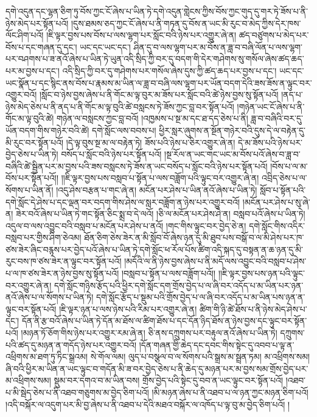 དགེ་འདུན་དང་ལྷན་ཅིག་ཏུ་བོས་ཀྱང་ངོ་ཞེས་པ་ཡིན་ཏེ་དགེ་འདུན་གླེངས་ཀྱིས་བོས་ཀྱང་གུད་དུ་གར་ཏེ་ཟོས་པ་ནི་ཉེས་མེད་པར་སྟོན་པའོ། །དུས་ཐམས་ཅད་ཀྱང་ངོ་ཞེས་པ་ནི་གཏན་དུ་བོས་ན་ཡང་མི་རུང་བ་མེད་ཀྱིས་དེར་ཁས་ལོང་ཤིག་པའོ། །ཇི་ལྟར་བྱས་པས་བོས་པ་ལས་ལྷག་པར་སློང་བའི་ཉེས་པར་འགྱུར་ཞེ་ན། ཚད་བཙུགས་པ་མེད་པར་བོས་པ་དང་གཞན་དུ་དང་། ཡང་དང་ཡང་དང་། ཤིན་དུ་བ་ལས་ལྷག་པར་མ་བོས་ན་ཟླ་བ་བཞི་ལོན་པ་ལས་ལྷག་པར་བཤགས་པ་ཟ་ནའོ་ཞེས་པ་ཡིན་ཏེ་ཡུན་འདི་སྲིད་ཀྱི་བར་དུ་བདག་གི་དེར་གཤེགས་སུ་གསོལ་ཞེས་ཚད་ཆད་པར་མ་བྱས་པ་དང་། འདི་སྲིད་ཀྱི་བར་དུ་གཤེགས་པར་གསོལ་ཞེས་དུས་ཀྱི་ཚད་ཆད་པར་བྱས་པ་དང་། ཡང་དང་ཡང་སྣོན་པ་དང་སྙིང་ནས་བོས་པ་རྣམས་མ་ཡིན་ལ་ཟླ་བ་བཞི་ལས་ལྷག་པར་ཡོན་བདག་དེའི་ཟས་ཟོས་ན་ལྟུང་བར་འགྱུར་བའོ། །སློང་བ་ཉེས་བྱས་ཞེས་པ་ནི་གོང་མ་ལྟ་བུར་མ་ཟོས་པར་སློང་བའི་ཚེ་ཉེས་བྱས་སུ་སྟོན་པའོ། །ནད་པ་ཉེས་མེད་ཅེས་པ་ནི་ནད་པ་ནི་གོང་མ་ལྟ་བུའི་ཚེ་བསླངས་ཏེ་ཟོས་ཀྱང་བླ་བར་སྟོན་པའོ། །གཉེན་ཡང་ངོ་ཞེས་པ་ནི་གོང་མ་ལྟ་བུའི་ཚེ། གཉེན་ལ་བསླངས་ཀྱང་བླ་བའོ། །འཁྱམས་པ་སྔ་མ་དང་ཐ་དད་ཅེས་པ་ནི། ཟླ་བ་བཞིའི་བར་དུ་ཡོན་བདག་གིས་གཉེར་བའི་ཚེ། དགེ་སློང་ལས་བབས་པ། ཕྱིར་སླར་ཞུགས་ན་སྔོན་གཉེར་བའི་དུས་དེ་ལ་བརྟེན་དུ་མི་རུང་བར་སྟོན་པའོ། །དེ་ལྟ་བུས་སྔ་མ་ལ་བརྟེན་ཏེ། ཟོས་པའི་ཉེས་པ་ཅིར་འགྱུར་ཞེ་ན། དེ་མ་ཟོས་པའི་ཉེས་པར་བྱེད་ཅེས་པ་ཡིན་ཏེ། བསོད་པ་སློང་བའི་ཉེས་པར་སྟོན་པའོ། །སྔ་རོལ་ན་ཡང་གང་ཡང་མ་བོས་པའོ་ཞེས་བ་ཟླ་བ་བཞིའི་ཚེ་སྦྱིན་པར་མ་བྱས་པའི་ཟས་བསླངས་ཏེ་ཟོས་ན་ཡང་བསོད་པ་སློང་བའི་ཉེས་པར་སྟོན་པའོ། །བོས་པ་ལ་མ་བོས་པར་སྟོན་པའོ།། །།ཇི་ལྟར་བྱས་པས་བསླབ་པ་སྟོན་པ་ལས་བཟློག་པའི་ལྟུང་བར་འགྱུར་ཞེ་ན། འབྲིད་ཅེས་པ་ལ་སོགས་པ་ཡིན་ནོ། །འདུ་ཤེས་བརྩན་པ་གང་ཞེ་ན། མངོན་པར་ཤེས་པ་ཡིན་ནའོ་ཞེས་པ་ཡིན་ཏེ། སློབ་པ་སྟོན་པའི་དགེ་སློང་དེ་ཤེས་པ་དང་ལྡན་བར་བདག་གིས་ཤེས་ལ་སླར་བཟློག་ན་ཉེས་པར་འགྱུར་བའོ། །མངོན་པར་ཤེས་པ་སུ་ཞེ་ན། ཟེར་བའོ་ཞེས་པ་ཡིན་ཏེ་གང་སྟོན་ཅིང་སྨྲ་བ་དེ་ལའོ། །ཅི་ལ་མངོན་པར་ཤེས་ཤེ་ན། བསླབ་པའོ་ཞེས་པ་ཡིན་ཏེ། འདུལ་བ་ལས་འབྱུང་བའི་བསླབ་པ་མངོན་པར་ཤེས་པ་ནའོ། །གང་གིས་ལྟུང་བར་བྱེད་ཅེ་ན། དགེ་སློང་གིས་འདིར་བསླབ་པར་གྱིས་ཤིག་ཅེའམ། ཐོན་ཅིག་ཅེས་ཟེར་ན་མི་སློབ་བོ་ཞེས་ཉན་དུ་མི་ཐུབ་པས་བསྒོ་བ་ལ་མི་ཤེས་པར་ཁ་ཙས་ཟེར་ཞིང་བརྙས་པར་བྱེད་པའོ་ཞེས་པ་ཡིན་ཏེ་དགེ་སློང་ཕ་རོལ་པོས་ཚིག་འདི་སྐད་དུ་བསྟན་ན་ཆ་ཉན་དུ་མི་རུང་བས་ཁ་ཙས་ཟེར་ན་ལྟུང་བར་སྟོན་པའོ། །མདོའི་ལ་ནི་ཉེས་བྱས་ཞེས་པ་ནི་མདོ་ལས་འབྱུང་བའི་བསླབ་པ་ཤེས་པ་ལ་ཁ་ཙས་ཟེར་ན་ཉེས་བྱས་སུ་སྟོན་པའོ། །བསླབ་པ་སྟོན་པ་ལས་བཟློག་པའོ།། །།ཇི་ལྟར་བྱས་པས་ཉན་པའི་ལྟུང་བར་འགྱུར་ཞེ་ན། དགེ་སློང་གཉིས་རྩོད་པའི་ཕྱིར་དགེ་སློང་དག་གྲོས་བྱེད་པ་ལ་ཞི་བར་འདོད་པ་མ་ཡིན་པར་ཉན་ནའོ་ཞེས་པ་ལ་སོགས་པ་ཡིན་ཏེ། དགེ་སློང་རྩོད་པ་སྡུམ་པའི་གྲོས་བྱེད་པ་ལ་ཞི་བར་འདོད་པ་མ་ཡིན་པས་ཉན་ན་ལྟུང་བར་སྟོན་པའོ། །ཇི་ལྟར་ཉན་པ་ལས་ཉེས་པའི་རིམ་པར་འགྱུར་ཞེ་ན། ཚིག་གི་ཉི་ཚེ་ཐོས་པ་ནི་ཉེས་མེད་ཤེས་པ་དང་། དོན་ནི་རྩ་བའོ་ཞེས་པ་ཡིན་ཏེ་དོན་མ་ཐོས་ལ་ཚིག་ཐོས་པ་དང་དོན་ཉིད་ཐོས་ན་ཉེས་བྱས་དང་ལྟུང་བར་སྟོན་པའོ། །མཉན་ཏོ་ཅོག་གིས་ཉེས་པར་འགྱུར་རམ་ཞེ་ན། ཅི་ནས་དཀྲུགས་པར་བརྟུལ་ནའོ་ཞེས་པ་ཡིན་ཏེ། དཀྲུགས་པའི་ཚད་དུ་མཉན་ན་གདོད་ཉེས་པར་འགྱུར་བའོ། །དོན་གཞན་གྱི་ཆེད་དང་དབང་གིས་སྟེང་དུ་འབབ་པ་ལྟ་ན་འཕྲིགས་མ་ཐག་ཏུ་ཏིང་སྒྲའམ། སེ་གོལ་ལམ། ལུད་པ་བསྩལ་བ་ལ་སོགས་པའི་སྒྲས་མ་སྦྲན་ཏམ། མ་འཕྲིགས་སམ། ཞི་བའི་ཕྱིར་མ་ཡིན་ན་ཡང་ལྟུང་བ་གདོན་མི་ཟ་བར་བྱེད་ཅེས་པ་ནི་ཆེད་དུ་མཉན་པར་མ་བྱས་སམ་གྲོས་བྱེད་པར་མ་འཕྲིགས་སམ། སྡུམ་བར་དགའ་བ་མ་ཡིན་བས། གྲོས་བྱེད་པའི་སྟེང་དུ་བབ་ན་ཡང་ལྟུང་བར་སྟོན་པའོ། །འཐབ་པ་མི་སྦེད་ཅེས་པ་ནི་འཐབ་གཅུགས་མ་བྱེད་ཅིག་པའོ། །མི་མཉན་ཞེས་པ་ནི་འཐབ་པ་ལ་ཉན་ཀྱང་མཉན་ཅིག་པའོ། །འདི་བསྐོར་ལ་འདུག་པར་མི་བྱ་ཞེས་པ་ནི་འཐབ་པ་དེའི་མཐའ་བསྐོར་ལ་འཁོད་པ་ལྟ་བུ་མ་བྱེད་ཅིག་པའོ། །
